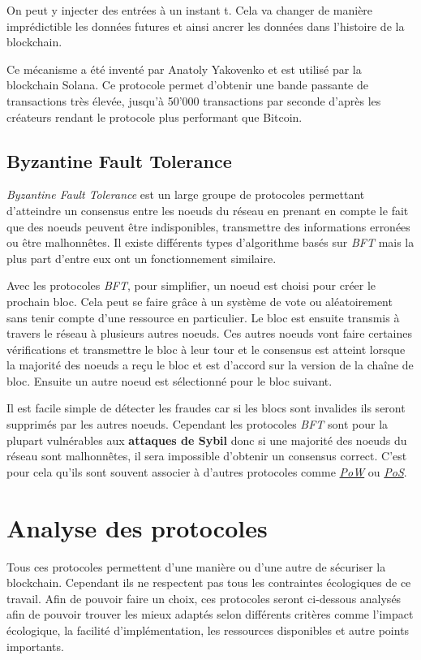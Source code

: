 On peut y injecter des entrées à un instant t. Cela va changer de manière imprédictible les données futures et ainsi ancrer les données dans l'histoire de la blockchain.

Ce mécanisme a été inventé par Anatoly Yakovenko et est utilisé par la blockchain Solana. Ce protocole permet d'obtenir une bande passante de transactions très élevée, jusqu'à 50'000 transactions par seconde d'après les créateurs rendant le protocole plus performant que Bitcoin.

\subsection{Byzantine Fault Tolerance}

\textit{Byzantine Fault Tolerance} est un large groupe de protocoles permettant d'atteindre un consensus entre les noeuds du réseau en prenant en compte le fait que des noeuds peuvent être indisponibles, transmettre des informations erronées ou être malhonnêtes. Il existe différents types d'algorithme basés sur \textit{BFT} mais la plus part d'entre eux ont un fonctionnement similaire. 

Avec les protocoles \textit{BFT}, pour simplifier, un noeud est choisi pour créer le prochain bloc. Cela peut se faire grâce à un système de vote ou aléatoirement sans tenir compte d'une ressource en particulier. Le bloc est ensuite transmis à travers le réseau à plusieurs autres noeuds. Ces autres noeuds vont faire certaines vérifications et transmettre le bloc à leur tour et le consensus est atteint lorsque la majorité des noeuds a reçu le bloc et est d'accord sur la version de la chaîne de bloc. Ensuite un autre noeud est sélectionné pour le bloc suivant.

Il est facile simple de détecter les fraudes car si les blocs sont invalides ils seront supprimés par les autres noeuds. Cependant les protocoles \textit{BFT} sont pour la plupart vulnérables aux \textbf{attaques de Sybil} donc si une majorité des noeuds du réseau sont malhonnêtes, il sera impossible d'obtenir un consensus correct. C'est pour cela qu'ils sont souvent associer à d'autres protocoles comme \hyperref[consensus:pow]{\textit{PoW}} ou \hyperref[consensus:pos]{\textit{PoS}}.

\section{Analyse des protocoles}

Tous ces protocoles permettent d'une manière ou d'une autre de sécuriser la blockchain. Cependant ils ne respectent pas tous les contraintes écologiques de ce travail. Afin de pouvoir faire un choix, ces protocoles seront ci-dessous analysés afin de pouvoir trouver les mieux adaptés selon différents critères comme l'impact écologique, la facilité d'implémentation, les ressources disponibles et autre points importants.

